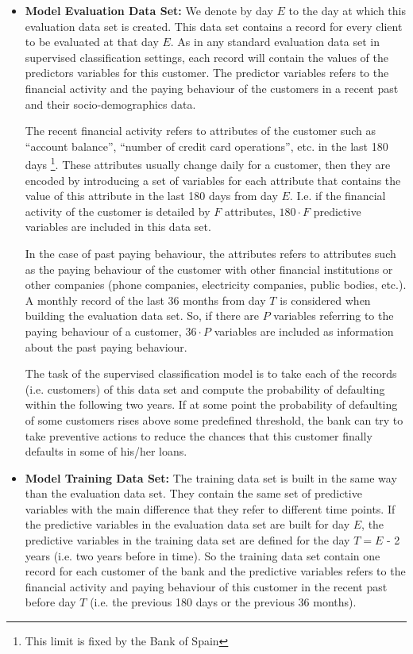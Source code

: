 \begin{itemize}
\item \textbf{Model Evaluation Data Set:} We denote by day $E$ to the day at which this evaluation data set is created. This data set contains a record for every client to be evaluated at that day $E$. As in any standard evaluation data set in supervised classification settings, each record will contain the values of the predictors variables for this customer. The predictor variables refers to the financial activity and the paying behaviour of the customers in a recent past and their socio-demographics data. 

The recent financial activity refers to attributes of the customer such as ``account balance'', ``number of credit card operations'', etc. in the last 180 days \footnote{This limit is fixed by the Bank of Spain}. These attributes usually change daily for a customer, then they are encoded by introducing a set of variables for each attribute that contains the value of this attribute in the last 180 days from day $E$. I.e. if the financial activity of the customer is detailed by $F$ attributes,   $180\cdot F$ predictive variables are included in this data set.

In the case of past paying behaviour, the attributes refers to attributes such as the paying behaviour of the customer with other financial institutions or other companies (phone companies, electricity companies, public bodies, etc.). A monthly record of the last 36 months from day $T$ is considered when building the evaluation data set. So, if there are $P$ variables referring to the paying behaviour of a customer, $36\cdot P$ variables are included as information about the past paying behaviour.  

The task of the supervised classification model is to take each of the records (i.e. customers) of this data set and compute the probability of defaulting within the following two years. If at some point the probability of defaulting of some customers rises above some predefined threshold, the bank can try to take preventive actions to reduce the chances that this customer finally defaults in some of his/her loans.

\item \textbf{Model Training Data Set:}  The training data set is built in the same way than the evaluation data set. They contain the same set of predictive variables with the main difference that they refer to different time points. If the predictive variables in the evaluation data set are built for day $E$, the predictive variables in the training data set are defined for the day $T = E$ - 2 years (i.e. two years before in time). So the training data set contain one record for each customer of the bank and the predictive variables refers to the financial activity and paying behaviour of this customer in the recent past before day $T$ (i.e. the previous 180 days or the previous 36 months). 


\end{itemize}

